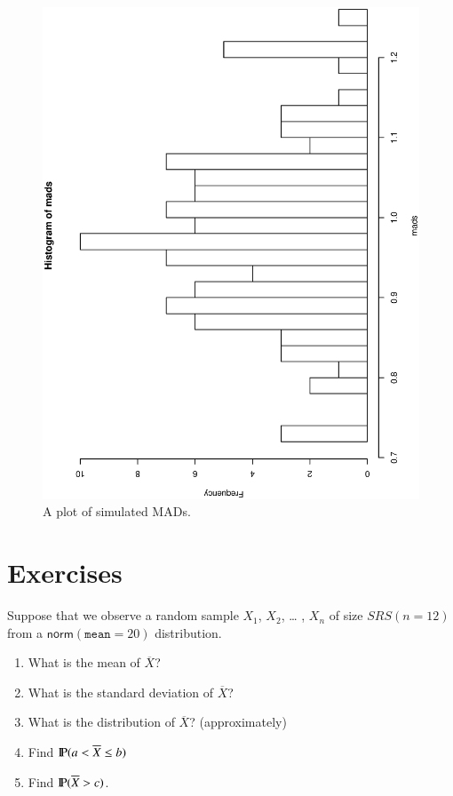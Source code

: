 \documentclass[captions=tableheading]{scrbook}
\begin{document}
\begin{figure}[th]
    \includegraphics[angle=270, totalheight=4in]{img/simulated-MAD.ps}
    \caption[Plot of simulated MADs]{\small A plot of simulated MADs.}
    \label{fig:simulated-MAD}
  \end{figure}

\newpage{}
\section{Exercises}
\label{sec-8-6}

\setcounter{thm}{0}



\begin{xca}
Suppose that we observe a random sample \(X_{1}\), \(X_{2}\), \ldots{} , \(X_{n}\) of size \( SRS( n =   12 ) \) from a \( \mathsf{norm}(\mathtt{mean}=  20) \) distribution. 
\begin{enumerate}
\item What is the mean of \(\overline{X}\)?
\item What is the standard deviation of \(\overline{X}\)?
\item What is the distribution of \(\overline{X}\)? (approximately)
\item Find \(\P(a< \overline{X} \leq b)\)
\item Find \(\P(\overline{X} > c)\).
\end{enumerate}
\end{xca}
\end{document}
